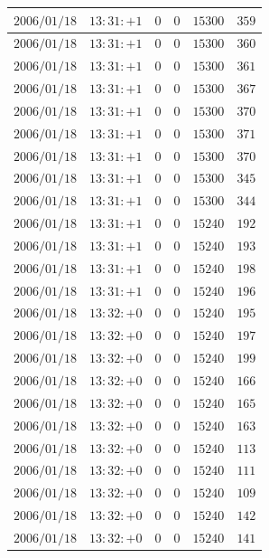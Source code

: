 \documentclass[a4j,papersize,disablejfam,slide,14pt]{jsarticle}
\begin{document}
\begin{description}
\begin{center}
\begin{longtable}{|l|l|l|l|l|l|}
					$2006/01/18$ & $13:31:+1$  & $0$ & $0$ & $15300$ & $359$ \\ \hline
					$2006/01/18$ & $13:31:+1$  & $0$ & $0$ & $15300$ & $360$ \\ \hline
					$2006/01/18$ & $13:31:+1$  & $0$ & $0$ & $15300$ & $361$ \\ \hline
					$2006/01/18$ & $13:31:+1$  & $0$ & $0$ & $15300$ & $367$ \\ \hline
					$2006/01/18$ & $13:31:+1$  & $0$ & $0$ & $15300$ & $370$ \\ \hline
					$2006/01/18$ & $13:31:+1$  & $0$ & $0$ & $15300$ & $371$ \\ \hline
					$2006/01/18$ & $13:31:+1$  & $0$ & $0$ & $15300$ & $370$ \\ \hline
					$2006/01/18$ & $13:31:+1$  & $0$ & $0$ & $15300$ & $345$ \\ \hline
					$2006/01/18$ & $13:31:+1$  & $0$ & $0$ & $15300$ & $344$ \\ \hline
					$2006/01/18$ & $13:31:+1$  & $0$ & $0$ & $15240$ & $192$ \\ \hline
					$2006/01/18$ & $13:31:+1$  & $0$ & $0$ & $15240$ & $193$ \\ \hline
					$2006/01/18$ & $13:31:+1$  & $0$ & $0$ & $15240$ & $198$ \\ \hline
					$2006/01/18$ & $13:31:+1$  & $0$ & $0$ & $15240$ & $196$ \\ \hline
					$2006/01/18$ & $13:32:+0$  & $0$ & $0$ & $15240$ & $195$ \\ \hline
					$2006/01/18$ & $13:32:+0$  & $0$ & $0$ & $15240$ & $197$ \\ \hline
					$2006/01/18$ & $13:32:+0$  & $0$ & $0$ & $15240$ & $199$ \\ \hline
					$2006/01/18$ & $13:32:+0$  & $0$ & $0$ & $15240$ & $166$ \\ \hline
					$2006/01/18$ & $13:32:+0$  & $0$ & $0$ & $15240$ & $165$ \\ \hline
					$2006/01/18$ & $13:32:+0$  & $0$ & $0$ & $15240$ & $163$ \\ \hline
					$2006/01/18$ & $13:32:+0$  & $0$ & $0$ & $15240$ & $113$ \\ \hline
					$2006/01/18$ & $13:32:+0$  & $0$ & $0$ & $15240$ & $111$ \\ \hline
					$2006/01/18$ & $13:32:+0$  & $0$ & $0$ & $15240$ & $109$ \\ \hline
					$2006/01/18$ & $13:32:+0$  & $0$ & $0$ & $15240$ & $142$ \\ \hline
					$2006/01/18$ & $13:32:+0$  & $0$ & $0$ & $15240$ & $141$ \\ \hline

\end{longtable}
\end{center}
\end{description}
\end{document}

